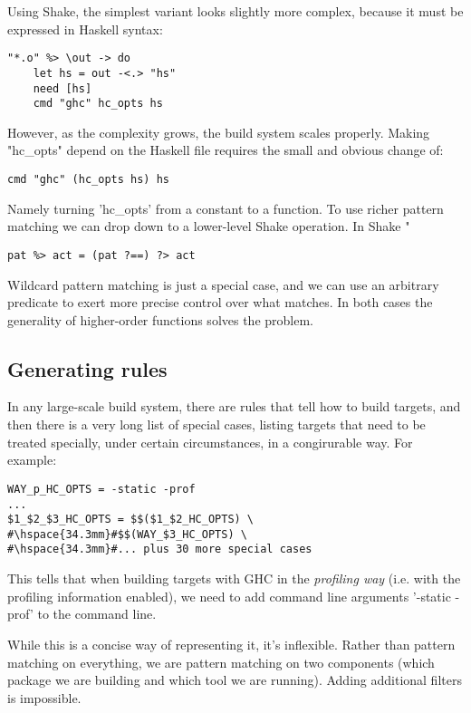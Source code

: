 \noindent Using Shake, the simplest variant looks slightly more complex, because
it must be expressed in Haskell syntax:

\begin{lstlisting}
"*.o" %> \out -> do
    let hs = out -<.> "hs"
    need [hs]
    cmd "ghc" hc_opts hs
\end{lstlisting}
\noindent
However, as the complexity grows, the build system scales properly. Making
\lst"hc_opts" depend on the Haskell file requires the small and obvious change of:

\begin{lstlisting}
cmd "ghc" (hc_opts hs) hs
\end{lstlisting}

\noindent Namely turning \lst'hc_opts' from a constant to a function. To use richer pattern matching we can drop down to a lower-level Shake operation. In Shake \lst"%

\begin{lstlisting}
pat %> act = (pat ?==) ?> act
\end{lstlisting}
\noindent
Wildcard pattern matching is just a special case, and we can use an
arbitrary predicate to exert more precise control over what matches.
In both cases the generality of higher-order functions solves the problem.

\subsection{Generating rules}

In any large-scale build system, there are rules that tell how to build targets,
and then there is a very long list of special cases, listing targets that need
to be treated specially, under certain circumstances, in a congirurable way. For
example: 

\begin{lstlisting}
WAY_p_HC_OPTS = -static -prof
...
$1_$2_$3_HC_OPTS = $$($1_$2_HC_OPTS) \
#\hspace{34.3mm}#$$(WAY_$3_HC_OPTS) \
#\hspace{34.3mm}#... plus 30 more special cases
\end{lstlisting}

This tells that when building targets with GHC in the \emph{profiling way}
(i.e. with the profiling information enabled), we need to add command line
arguments \lst'-static -prof' to the command line.

While this is a concise way of representing it, it's inflexible. Rather than
pattern matching on everything, we are pattern matching on two components (which
package we are building and which tool we are running). Adding additional
filters is impossible.

